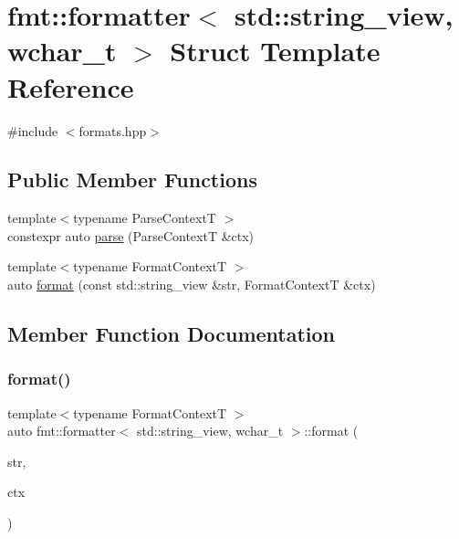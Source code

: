 \hypertarget{structfmt_1_1formatter_3_01std_1_1string__view_00_01wchar__t_01_4}{}\section{fmt\+:\+:formatter$<$ std\+:\+:string\+\_\+view, wchar\+\_\+t $>$ Struct Template Reference}
\label{structfmt_1_1formatter_3_01std_1_1string__view_00_01wchar__t_01_4}


{\ttfamily \#include $<$formats.\+hpp$>$}

\subsection*{Public Member Functions}
\begin{DoxyCompactItemize}
\item 
{\footnotesize template$<$typename Parse\+ContextT $>$ }\\constexpr auto \mbox{\hyperlink{structfmt_1_1formatter_3_01std_1_1string__view_00_01wchar__t_01_4_acf25fd4768fcfe66e7dafb38fa427964}{parse}} (Parse\+ContextT \&ctx)
\item 
{\footnotesize template$<$typename Format\+ContextT $>$ }\\auto \mbox{\hyperlink{structfmt_1_1formatter_3_01std_1_1string__view_00_01wchar__t_01_4_ab99fa55563f9d469d7158bb5424db9a3}{format}} (const std\+::string\+\_\+view \&str, Format\+ContextT \&ctx)
\end{DoxyCompactItemize}


\subsection{Member Function Documentation}
\mbox{\label{structfmt_1_1formatter_3_01std_1_1string__view_00_01wchar__t_01_4_ab99fa55563f9d469d7158bb5424db9a3}} 
\subsubsection{\texorpdfstring{format()}{format()}}
{\footnotesize\ttfamily template$<$typename Format\+ContextT $>$ \\
auto fmt\+::formatter$<$ std\+::string\+\_\+view, wchar\+\_\+t $>$\+::format (\begin{DoxyParamCaption}\item[{const std\+::string\+\_\+view \&}]{str,  }\item[{Format\+ContextT \&}]{ctx }\end{DoxyParamCaption})}

